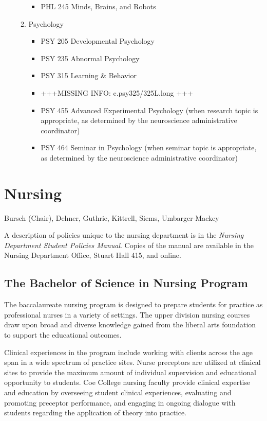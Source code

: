 \documentclass[
  letterpaper,
]{scrbook}
\providecommand{\tightlist}{%
  \setlength{\itemsep}{0pt}\setlength{\parskip}{0pt}}
\begin{document}
\begin{enumerate}
\begin{enumerate}
    \begin{itemize}
    \tightlist
    \item
      PHL 245 Minds, Brains, and Robots
    \end{itemize}
  \item
    Psychology

    \begin{itemize}
    \tightlist
    \item
      PSY 205 Developmental Psychology
    \item
      PSY 235 Abnormal Psychology
    \item
      PSY 315 Learning \& Behavior
    \item
      +++MISSING INFO: c.psy325/325L.long +++
    \item
      PSY 455 Advanced Experimental Psychology (when research topic is
      appropriate, as determined by the neuroscience administrative
      coordinator)
    \item
      PSY 464 Seminar in Psychology (when seminar topic is appropriate,
      as determined by the neuroscience administrative coordinator)
    \end{itemize}
  \end{enumerate}
\end{enumerate}

\section{Nursing}\label{nursing}

Bursch (Chair), Dehner, Guthrie, Kittrell, Siems, Umbarger-Mackey

A description of policies unique to the nursing department is in the
\emph{Nursing Department Student Policies Manual}. Copies of the manual
are available in the Nursing Department Office, Stuart Hall 415, and
online.

\subsection{The Bachelor of Science in Nursing
Program}\label{the-bachelor-of-science-in-nursing-program}

The baccalaureate nursing program is designed to prepare students for
practice as professional nurses in a variety of settings. The upper
division nursing courses draw upon broad and diverse knowledge gained
from the liberal arts foundation to support the educational outcomes.

Clinical experiences in the program include working with clients across
the age span in a wide spectrum of practice sites. Nurse preceptors are
utilized at clinical sites to provide the maximum amount of individual
supervision and educational opportunity to students. Coe College nursing
faculty provide clinical expertise and education by overseeing student
clinical experiences, evaluating and promoting preceptor performance,
and engaging in ongoing dialogue with students regarding the application
of theory into practice.
\end{document}
